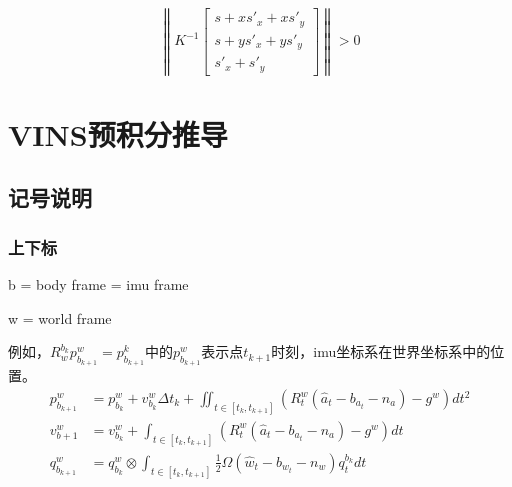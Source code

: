 \documentclass{ctexart}
\begin{document}
	\begin{equation}
	\left\|
	K^{-1}
	\begin{bmatrix}
	s + x s'_x + x s'_y \\
	s + y s'_x + y s'_y \\
	s'_x + s'_y
	\end{bmatrix}
	\right\|
	> 0
	\end{equation}


	
	\section{VINS预积分推导}
	\subsection{记号说明}
	\subsubsection{上下标}
	\par b = body frame = imu frame
	\par w = world frame
	\par 例如，$R_w^{b_k} p_{b_{k+1}}^w = p_{b_{k+1}}^k$中的$p_{b_{k+1}}^w$表示点$t_{k+1}$时刻，imu坐标系在世界坐标系中的位置。
	\begin{equation}
		\begin{split}
			p_{b_{k+1}}^w & = p_{b_k}^w + v_{b_k}^w \Delta t_k +\iint_{t\in [t_k,t_{k+1}]} (R^w_t(\hat{a}_t-b_{a_t}-n_a)-g^w) dt^2 \\
			v_{b+1}^w & = v_{b_k}^w + \int_{t\in [t_k,t_{k+1}]} (R^w_t(\hat{a}_t-b_{a_t}-n_a)-g^w) dt \\
			q_{b_{k+1}}^w & = q_{b_k}^w \otimes \int_{t\in [t_k,t_{k+1}]} \frac{1}{2} \Omega(\hat{w}_t-b_{w_t}-n_w)q_t^{b_k} dt
		\end{split}
	\end{equation}
\end{document}

